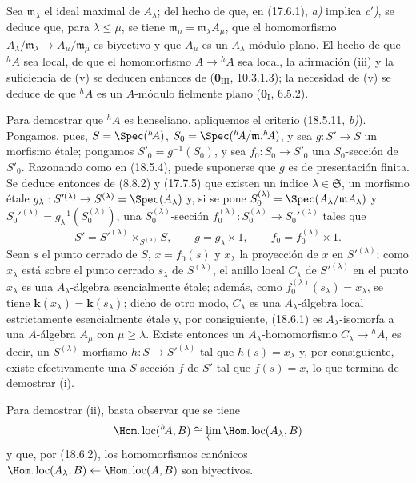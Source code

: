 
Sea $\mathfrak m_\lambda$ el ideal maximal de $A_\lambda$; del hecho de que, en (17.6.1), \emph{a)} implica \emph{c$'$)}, se deduce que, para $\lambda\leq\mu$, se tiene $\mathfrak m_\mu=\mathfrak m_\lambda A_\mu$, que el homomorfismo $A_\lambda/\mathfrak m_\lambda\to A_\mu/\mathfrak m_\mu$ es biyectivo y que $A_\mu$ es un $A_\lambda$-módulo plano. El hecho de que ${}^h\!A$ sea local, de que el homomorfismo $A\to{}^h\!A$ sea local, la afirmación (iii) y la suficiencia de (v) se deducen entonces de ($\mathbf 0_{\mathrm{III}}$, 10.3.1.3); la necesidad de (v) se deduce de que ${}^h\!A$ es un $A$-módulo fielmente plano ($\mathbf 0_{\mathrm I}$, 6.5.2).

Para demostrar que ${}^h\!A$ es henseliano, apliquemos el criterio (18.5.11, \emph{b)}). Pongamos, pues, $S=\Spec({}^h\!A)$, $S_0=\Spec({}^h\!A/\mathfrak m.{}^h\!A)$, y sea $g:S'\to S$ un morfismo étale; pongamos $S'_0=g^{-1}(S_0)$, y sea $f_0:S_0\to S'_0$ una $S_0$-sección de $S'_0$. Razonando como en (18.5.4), puede suponerse que $g$ es de presentación finita. Se deduce entonces de (8.8.2) y (17.7.5) que existen un índice $\lambda\in\mathfrak S$, un morfismo étale $g_\lambda:S'^{(\lambda)}\to S^{(\lambda)}=\Spec(A_\lambda)$ y, si se pone $S_0^{(\lambda)}=\Spec(A_\lambda/\mathfrak mA_\lambda)$ y $S_0'^{(\lambda)}=g_\lambda^{-1}(S_0^{(\lambda)})$, una $S_0^{(\lambda)}$-sección $f_0^{(\lambda)}:S_0^{(\lambda)}\to S_0'^{(\lambda)}$ tales que
\[
  S'=S'^{(\lambda)}\times_{S^{(\lambda)}}S,\qquad
  g=g_\lambda\times1,\qquad
  f_0=f_0^{(\lambda)}\times1.
\]
Sean $s$ el punto cerrado de $S$, $x=f_0(s)$ y $x_\lambda$ la proyección de $x$ en $S'^{(\lambda)}$; como $x_\lambda$ está sobre el punto cerrado $s_\lambda$ de $S^{(\lambda)}$, el anillo local $C_\lambda$ de $S'^{(\lambda)}$ en el punto $x_\lambda$ es una $A_\lambda$-álgebra esencialmente étale; además, como $f_0^{(\lambda)}(s_\lambda)=x_\lambda$, se tiene $\boldsymbol k(x_\lambda)=\boldsymbol k(s_\lambda)$; dicho de otro modo, $C_\lambda$ es una $A_\lambda$-álgebra local estrictamente esencialmente étale y, por consiguiente, (18.6.1) es $A_\lambda$-isomorfa a una $A$-álgebra $A_\mu$ con $\mu\geq\lambda$. Existe entonces un $A_\lambda$-homomorfismo $C_\lambda\to{}^h\!A$, es decir, un $S^{(\lambda)}$-morfismo $h:S\to S'^{(\lambda)}$ tal que $h(s)=x_\lambda$ y, por consiguiente, existe efectivamente una $S$-sección $f$ de $S'$ tal que $f(s)=x$, lo que termina de demostrar (i).

Para demostrar (ii), basta observar que se tiene
\[
  \Hom.\operatorname{loc}({}^h\!A,B)\cong\varprojlim\Hom.\operatorname{loc}(A_\lambda,B)
\]
y que, por (18.6.2), los homomorfismos canónicos $\Hom.\operatorname{loc}(A_\lambda,B)\leftarrow\Hom.\operatorname{loc}(A,B)$ son biyectivos.

